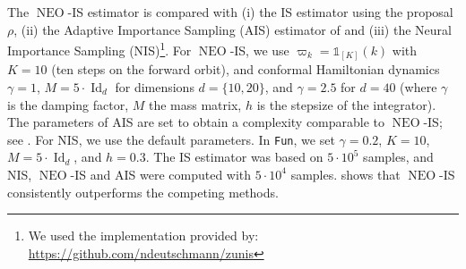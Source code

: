 \documentclass{article}
\def\IFIS{\ensuremath{\operatorname{NEO}}}
\def\NEO{{\small \IFIS}}
\def\Id{\operatorname{Id}}
\newcommand{\1}{\mathds{1}}
\newcommand{\indi}[1]{\1_{#1}}
\def\Id{\operatorname{Id}}
\def\Id{\operatorname{Id}}
\begin{document}
 The $\IFIS$-IS estimator is compared with (i) the IS estimator using the proposal $\rho$, (ii) the   Adaptive Importance Sampling (AIS) estimator of \cite{tokdar2010importance} and (iii) the Neural Importance Sampling (NIS)\footnote{We used the implementation provided by: \url{https://github.com/ndeutschmann/zunis}}.  For \NEO-IS, we use $\varpi_k= \indi{[K]}(k)$  with $K=10$ (ten steps on the forward orbit), and conformal Hamiltonian dynamics  $\gamma = 1$, $M= 5 \cdot \Id_d$ for dimensions  $d=\{10,20\}$, and $\gamma = 2.5$ for $d=40$ (where $\gamma$ is the damping factor, $M$ the mass matrix,  $h$ is the stepsize of the integrator). The parameters of AIS are set to obtain a complexity comparable to \NEO-IS; see . For NIS, we use the default parameters.
 In \texttt{Fun}, we set $\gamma = 0.2$, $K = 10$, $M = 5 \cdot \Id_d$, and $h=0.3$. The IS estimator was based on $5 \cdot 10^5$ samples, and NIS, \NEO-IS and AIS were computed with $5 \cdot 10^4$  samples.
  shows that \IFIS-IS consistently outperforms the competing methods. 
\end{document}
